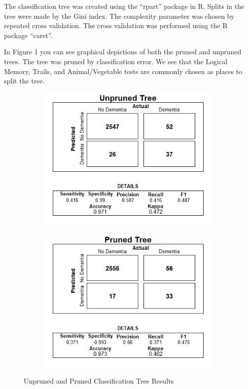 \documentclass[a4paper,man,natbib,11pt]{article}
\begin{document}
The classification tree was created using the ``rpart'' package in R. Splits in the tree were made by the Gini index. The complexity parameter was chosen by repeated cross validation. The cross validation was performed using the R package ``caret''.

In Figure 1 you can see graphical depictions of both the pruned and unpruned trees. The tree was pruned by classification error. We see that the Logical Memory, Trails, and Animal/Vegetable tests are commonly chosen as places to split the tree.

\begin{figure}
\centering
\begin{subfigure}{.5\textwidth}
  \centering
  \includegraphics[width=\linewidth]{unpruned_confusion.png}
\end{subfigure}%
\begin{subfigure}{.5\textwidth}
  \centering
  \includegraphics[width=\linewidth]{pruned_confusion.png}
\end{subfigure}
\caption{Unpruned and Pruned Classification Tree Results}
\label{fig:test}
\end{figure}
\end{document}
